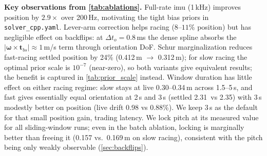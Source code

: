 \textbf{Key observations from \autoref{tab:ablations}.}
Full-rate \ac{imu} (1\,kHz) improves position by $2.9\times$ over 200\,Hz,
motivating the tight bias priors in \texttt{solver\_cpp.yaml}.
Lever-arm correction helps racing ($8$--$11\%$ position) but has
negligible effect on backflips: at $\Delta t_o{=}0.8$\,ms the dense
spline absorbs the $|\bm{\omega}{\times}\mathbf{t}_{bs}|\approx1$\,m/s
term through orientation DoF.
Schur marginalization reduces fast-racing settled position by 24\%
(0.412\,m $\to$ 0.312\,m); for slow racing the optimal prior scale is
$10^{-7}$ (near-zero), so both variants give equivalent results;
the benefit is captured in \autoref{tab:prior_scale} instead.
Window duration has little effect on either racing regime: slow stays at
live 0.30--0.34\,m across 1.5--5\,s, and fast gives essentially equal
orientation at 2\,s and 3\,s (settled 2.31\degree\ vs 2.35\degree) with
3\,s modestly better on position (live drift 0.98 vs 0.88\%).  We keep
3\,s as the default for that small position gain, trading latency.
We lock pitch at its measured value for all sliding-window runs; even
in the batch ablation, locking is marginally better than freeing it
(0.157 vs.\ 0.169\,m on slow racing), consistent with the pitch being
only weakly observable (\autoref{sec:backflips}).
